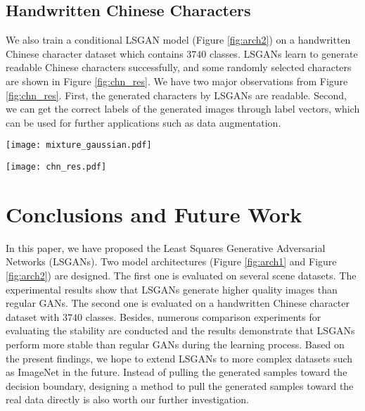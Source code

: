\documentclass{article} %
\begin{document}
\subsection{Handwritten Chinese Characters}
We also train a conditional LSGAN model (Figure \ref{fig:arch2}) on a handwritten Chinese character dataset which contains $3740$ classes. LSGANs learn to generate readable Chinese characters successfully, and some randomly selected characters are shown in Figure \ref{fig:chn_res}. We have two major observations from Figure \ref{fig:chn_res}. First, the generated characters by LSGANs are readable. Second, we can get the correct labels of the generated images through label vectors, which can be used for further applications such as data augmentation. 

\begin{figure*}[t]
\centering
 \texttt{[image: mixture\_gaussian.pdf]}
\caption{
 Dynamic results of Gaussian kernel estimation for LSGANs and regular GANs. The final column shows the real data distribution. 
}
\label{fig:gaussian}

\end{figure*}
\begin{figure*}[t]
\centering
 \texttt{[image: chn\_res.pdf]}
\caption{
Generated images of handwritten Chinese characters by LSGANs. For row $1$ and row $2$, the images in the same column belong to the same class of characters. Row $3$ and row $4$ are also with this condition. The generated characters are readable.
}
\label{fig:chn_res}
\end{figure*}

\section{Conclusions and Future Work}
\label{sec:conclusion}
In this paper, we have proposed the Least Squares Generative Adversarial Networks (LSGANs). Two model architectures (Figure \ref{fig:arch1} and Figure \ref{fig:arch2}) are designed. The first one is evaluated on several scene datasets. The experimental results show that LSGANs generate higher quality images than regular GANs. The second one is evaluated on a handwritten Chinese character dataset with $3740$ classes. Besides, numerous comparison experiments for evaluating the stability are conducted and the results demonstrate that LSGANs perform more stable than regular GANs during the learning process. Based on the present findings, we hope to extend LSGANs to more complex datasets such as ImageNet in the future. Instead of pulling the generated samples toward the decision boundary, designing a method to pull the generated samples toward the real data directly is also worth our further investigation.



\end{document}

